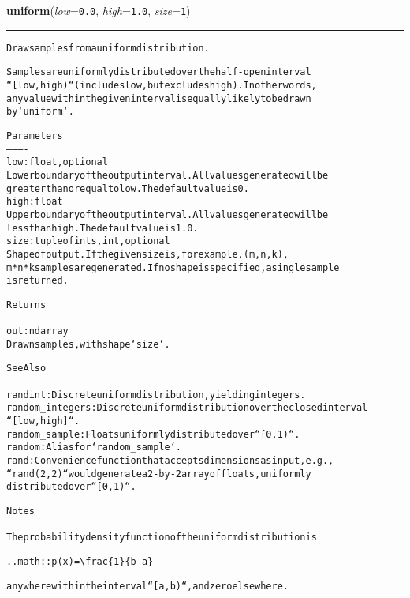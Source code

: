     \label{trunk:qstkutil:bollinger:uniform}

    \vspace{0.5ex}

\hspace{.8\funcindent}\begin{boxedminipage}{\funcwidth}

    \raggedright \textbf{uniform}(\textit{low}={\tt 0.0}, \textit{high}={\tt 1.0}, \textit{size}={\tt 1})

    \vspace{-1.5ex}

    \rule{\textwidth}{0.5\fboxrule}
\setlength{\parskip}{2ex}
\begin{alltt}
Draw samples from a uniform distribution.

Samples are uniformly distributed over the half-open interval
``[low, high)`` (includes low, but excludes high).  In other words,
any value within the given interval is equally likely to be drawn
by `uniform`.

Parameters
----------
low : float, optional
    Lower boundary of the output interval.  All values generated will be
    greater than or equal to low.  The default value is 0.
high : float
    Upper boundary of the output interval.  All values generated will be
    less than high.  The default value is 1.0.
size : tuple of ints, int, optional
    Shape of output.  If the given size is, for example, (m,n,k),
    m*n*k samples are generated.  If no shape is specified, a single sample
    is returned.

Returns
-------
out : ndarray
    Drawn samples, with shape `size`.

See Also
--------
randint : Discrete uniform distribution, yielding integers.
random\_integers : Discrete uniform distribution over the closed interval
                  ``[low, high]``.
random\_sample : Floats uniformly distributed over ``[0, 1)``.
random : Alias for `random\_sample`.
rand : Convenience function that accepts dimensions as input, e.g.,
       ``rand(2,2)`` would generate a 2-by-2 array of floats, uniformly
       distributed over ``[0, 1)``.

Notes
-----
The probability density function of the uniform distribution is

.. math:: p(x) = {\textbackslash}frac\{1\}\{b - a\}

anywhere within the interval ``[a, b)``, and zero elsewhere.


\end{alltt}
\end{boxedminipage}
